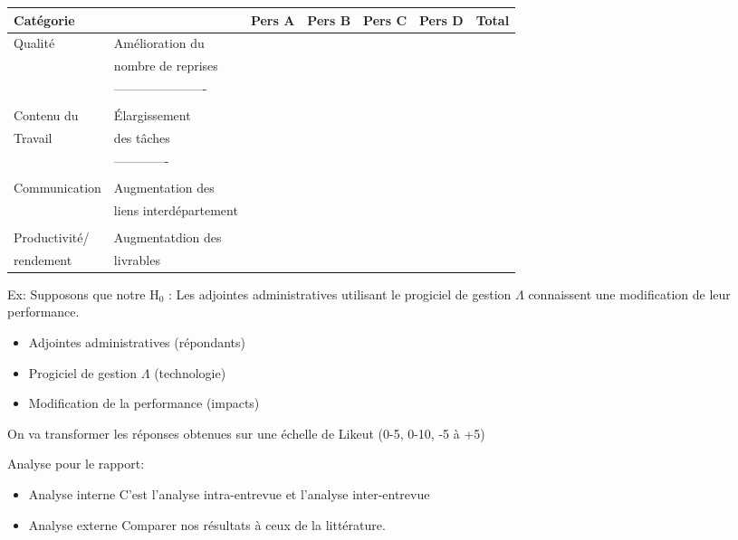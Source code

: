 \documentclass[11pt]{article}
\begin{document}
\begin{enumerate}
\begin{enumerate}
\begin{center}
\begin{tabular}{lllllll}
\hline
Catégorie &  & Pers A & Pers B & Pers C & Pers D & Total\\
\hline
Qualité & Amélioration du &  &  &  &  & \\
 & nombre de reprises &  &  &  &  & \\
 & ---------------------- &  &  &  &  & \\
 &  &  &  &  &  & \\
\hline
Contenu du & Élargissement &  &  &  &  & \\
Travail & des tâches &  &  &  &  & \\
 & ------------- &  &  &  &  & \\
 &  &  &  &  &  & \\
\hline
Communication & Augmentation des &  &  &  &  & \\
 & liens interdépartement &  &  &  &  & \\
 &  &  &  &  &  & \\
\hline
Productivité/ & Augmentatdion des &  &  &  &  & \\
rendement & livrables &  &  &  &  & \\
\hline
\end{tabular}
\end{center}

Ex: Supposons que notre H\(_{\text{0}}\) : Les adjointes administratives utilisant le
progiciel de gestion \(\Lambda\) connaissent une modification de leur performance.

\begin{itemize}
\item Adjointes administratives (répondants)
\item Progiciel de gestion \(\Lambda\) (technologie)
\item Modification de la performance (impacts)
\end{itemize}

On va transformer les réponses obtenues sur une échelle de Likeut (0-5, 0-10,
-5 à +5)

Analyse pour le rapport:
\begin{itemize}
\item Analyse interne
C'est l'analyse intra-entrevue et l'analyse inter-entrevue

\item Analyse externe
Comparer nos résultats à ceux de la littérature.
\end{itemize}


\end{enumerate}
\end{enumerate}
\end{document}
